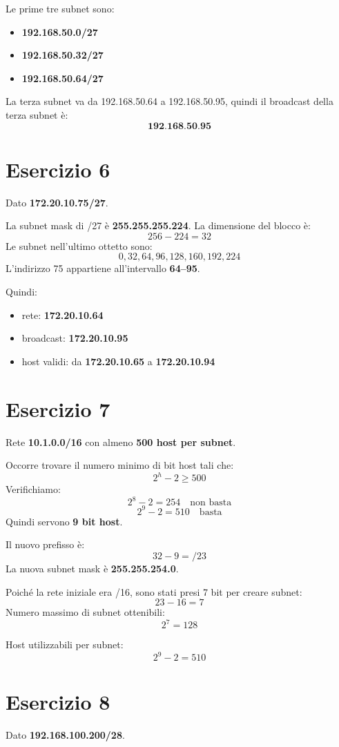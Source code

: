 \documentclass[a4paper,12pt]{article}
\begin{document}
Le prime tre subnet sono:
\begin{itemize}
    \item \textbf{192.168.50.0/27}
    \item \textbf{192.168.50.32/27}
    \item \textbf{192.168.50.64/27}
\end{itemize}

La terza subnet va da 192.168.50.64 a 192.168.50.95, quindi il broadcast della terza subnet è:
\[
\textbf{192.168.50.95}
\]

\section*{Esercizio 6}
Dato \textbf{172.20.10.75/27}.

La subnet mask di /27 è \textbf{255.255.255.224}. La dimensione del blocco è:
\[
256 - 224 = 32
\]
Le subnet nell'ultimo ottetto sono:
\[
0, 32, 64, 96, 128, 160, 192, 224
\]
L'indirizzo 75 appartiene all'intervallo \textbf{64--95}.

Quindi:
\begin{itemize}
    \item rete: \textbf{172.20.10.64}
    \item broadcast: \textbf{172.20.10.95}
    \item host validi: da \textbf{172.20.10.65} a \textbf{172.20.10.94}
\end{itemize}

\section*{Esercizio 7}
Rete \textbf{10.1.0.0/16} con almeno \textbf{500 host per subnet}.

Occorre trovare il numero minimo di bit host tali che:
\[
2^h - 2 \geq 500
\]
Verifichiamo:
\[
2^8 - 2 = 254 \quad \text{non basta}
\]
\[
2^9 - 2 = 510 \quad \text{basta}
\]
Quindi servono \textbf{9 bit host}.

Il nuovo prefisso è:
\[
32 - 9 = /23
\]
La nuova subnet mask è \textbf{255.255.254.0}.

Poiché la rete iniziale era /16, sono stati presi 7 bit per creare subnet:
\[
23 - 16 = 7
\]
Numero massimo di subnet ottenibili:
\[
2^7 = 128
\]

Host utilizzabili per subnet:
\[
2^9 - 2 = 510
\]

\section*{Esercizio 8}
Dato \textbf{192.168.100.200/28}.
\end{document}
